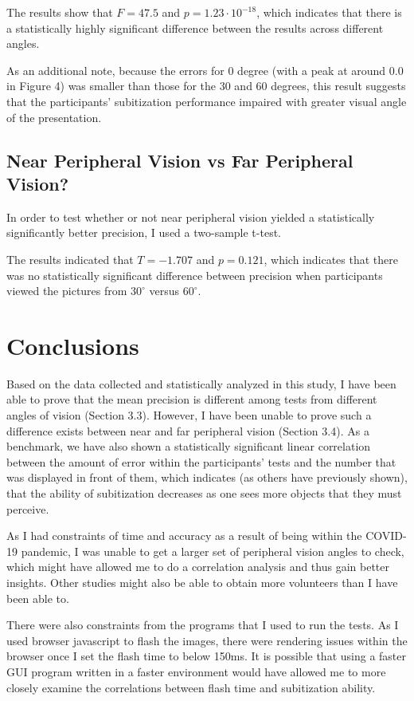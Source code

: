 \documentclass[12pt]{article}
\begin{document}
The results show that $F=47.5$ and $p = 1.23 \cdot 10^{-18}$, which indicates
that there is a statistically highly significant difference between the results
across different angles.

As an additional note, because the errors for 0 degree (with a peak at around
$0.0$ in Figure 4) was smaller than those for the 30 and 60 degrees,
this result suggests that the participants’ subitization performance
impaired with greater visual angle of the presentation.

\subsection{Near Peripheral Vision vs Far Peripheral Vision?}

In order to test whether or not near peripheral vision yielded a statistically
significantly better precision, I used a two-sample t-test.

The results indicated that $T = -1.707$ and $p = 0.121$, which indicates that
there was no statistically significant difference between precision when
participants viewed the pictures from $30^{\circ}$ versus $60^{\circ}$.

\section{Conclusions}
Based on the data collected and statistically analyzed in this study, I have
been able to prove that the mean precision is different among tests from
different angles of vision (Section 3.3).  However, I have been unable to prove
such a difference exists between near and far peripheral vision (Section 3.4).
As a benchmark, we have also shown a statistically significant linear
correlation between the amount of error within the participants' tests and the
number that was displayed in front of them, which indicates (as others have
previously shown), that the ability of subitization decreases as one
sees more objects that they must perceive.

As I had constraints of time and accuracy as a result of being within the
COVID-19 pandemic, I was unable to get a larger set of peripheral vision angles
to check, which might have allowed me to do a correlation analysis and thus
gain better insights. Other studies might also be able to obtain more
volunteers than I have been able to.

There were also constraints from the programs that I used to run the tests. As
I used browser javascript to flash the images, there were rendering issues
within the browser once I set the flash time to below 150ms. It is possible
that using a faster GUI program written in a faster environment would have
allowed me to more closely examine the correlations between flash time and
subitization ability.

\printbibliography
\end{document}
